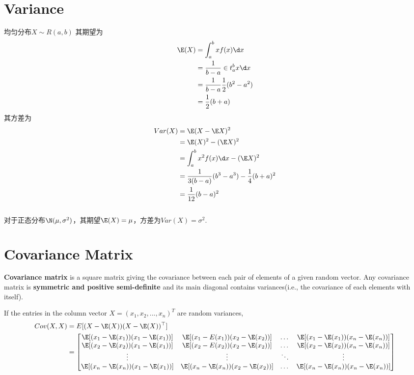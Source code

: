 \section{Variance}
均匀分布$X \sim R(a, b)$
其期望为
\begin{equation}
    \begin{split}
        \E(X) &= \int_{a}^{b}x f(x) \d x		\\
        &= \frac{1}{b-a}\in t_{a}^{b}x \d x	\\
        &= \frac{1}{b-a} \frac{1}{2} (b^2 - a^2)	\\
        &= \frac{1}{2}(b + a)
    \end{split}
\end{equation}
其方差为
\begin{equation}
    \begin{split}
        Var(X) &= \E(X - \E X)^2  \\
        &= \E(X)^2 - (\E X)^2 \\
        &= \int_{a}^{b} x^2 f(x) \d x - (\E X)^2 \\
        &= \frac{1}{3(b-a)} (b^3 - a^3) - \frac{1}{4}(b+a)^2 \\
        &= \frac{1}{12}(b-a)^2
    \end{split}
\end{equation}
\\
对于正态分布$\N(\mu, \sigma ^2)$，其期望$\E(X) = \mu$，方差为$Var(X) = \sigma^2$.


\section{Covariance Matrix}
\textbf{Covariance matrix} is a square matrix giving the covariance between each pair of elements of a given random vector.
Any covariance matrix is \textbf{symmetric and positive semi-definite} and its main diagonal contains variances(i.e., the covariance of each elements with itself).


If the entries in the column vector $X = (x_1, x_2, ..., x_n)^T$ are random variances, 
\[
    \begin{split}
        Cov(X, X) 
        &= E[(X - \E(X))(X - \E(X))^\top] \\
        &= 
        \begin{bmatrix}
            \E[(x_1-\E(x_1))(x_1-\E(x_1))] & \E[(x_1-E(x_1))(x_2-\E(x_2))] & \dots & \E[(x_1-\E(x_1))(x_n-\E(x_n))] \\
            \E[(x_2-\E(x_2))(x_1-\E(x_1))] & \E[(x_2-E(x_2))(x_2-\E(x_2))] & \dots & \E[(x_2-\E(x_2))(x_n-\E(x_n))] \\
            \vdots & \vdots & \ddots &\vdots \\
            \E[(x_n-\E(x_n))(x_1-\E(x_1))] & \E[(x_n-\E(x_n))(x_2-\E(x_2))] & \dots & \E[(x_n-\E(x_n))(x_n-\E(x_n))]
        \end{bmatrix}
    \end{split}
\]

